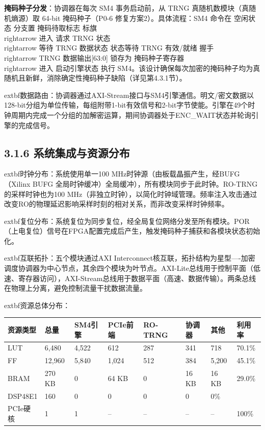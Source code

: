 \documentclass[journal]{IEEEtran}
\begin{document}
\textbf{掩码种子分发}：协调器在每次 SM4 事务启动前，从 TRNG 真随机数模块（真随机熵源）取 64-bit 掩码种子（P0-6 修复方案2）。具体流程：SM4 命令在 空闲状态 分支置 掩码待取标志 标旗 \\rightarrow 进入 请求 TRNG 状态 \\rightarrow 等待 TRNG 数据状态 状态等待 TRNG 有效/就绪 握手 \\rightarrow TRNG 数据输出[63:0] 锁存为 掩码种子寄存器 \\rightarrow 进入 启动引擎状态 执行 SM4。该设计确保每次加密的掩码种子均为真随机且新鲜，消除确定性掩码种子缺陷（详见第4.3.1节）。

	extbf{数据路由}：协调器通过AXI-Stream接口与SM4引擎通信。明文/密文数据以128-bit分组为单位传输，每组附带1-bit有效信号和2-bit字节使能。引擎在49个时钟周期内完成一个分组的加解密运算，期间协调器处于ENC\_WAIT状态并轮询引擎的完成信号。

\subsection{3.1.6 系统集成与资源分布}

	extbf{时钟分布}：系统使用单一100 MHz时钟源（由板载晶振产生，经BUFG（Xilinx BUFG 全局时钟缓冲）全局缓冲），所有模块同步于此时钟。RO-TRNG的采样时钟也为100 MHz（非独立时钟），以简化时钟域管理。频率注入攻击通过改变RO的物理延迟影响采样时刻的相对关系，而非改变采样时钟频率。

	extbf{复位分布}：系统复位为同步复位，经全局复位网络分发至所有模块。POR（上电复位）信号在FPGA配置完成后产生，触发掩码种子捕获和各模块状态初始化。

	extbf{互联拓扑}：五个模块通过AXI Interconnect核互联，拓扑结构为星型----加密调度协调器为中心节点，其余四个模块为叶节点。AXI-Lite总线用于控制平面（低速、寄存器访问），AXI-Stream总线用于数据平面（高速、数据传输）。两条总线在物理上分离，避免控制流量干扰数据流量。

	extbf{资源总体分布}：

\begin{table}[h]
\centering
\begin{tabular}{llllllll}
\hline
\textbf{资源类型} & \textbf{总量} & \textbf{SM4引擎} & \textbf{PCIe前端} & \textbf{RO-TRNG} & \textbf{协调器} & \textbf{其他} & \textbf{利用率} \\
\hline
LUT & 6,480 & 4,522 & 612 & 287 & 341 & 718 & 70.1\% \\
FF & 12,960 & 5,840 & 1,024 & 512 & 384 & 5,200 & 45.1\% \\
BRAM & 270 KB & 0 & 64 KB & 0 & 16 KB & 16 KB & 29.0\% \\
DSP48E1 & 160 & 0 & 0 & 0 & 0 & 0\% \\
PCIe硬核 & 1 & 1 & -- & -- & -- & -- & 100\% \\
\hline
\end{tabular}
\end{table}
\end{document}
